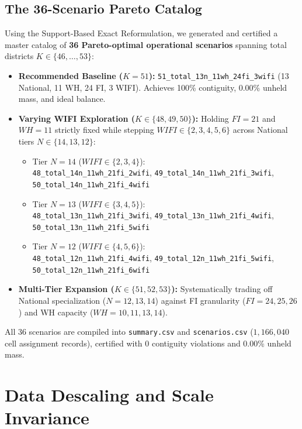 \documentclass[11pt,a4paper]{article}
\theoremstyle{plain}
\theoremstyle{definition}
\begin{document}
\subsection{The 36-Scenario Pareto Catalog}
Using the Support-Based Exact Reformulation, we generated and certified a master catalog of \textbf{36 Pareto-optimal operational scenarios} spanning total districts $K \in \{46, \dots, 53\}$:
\begin{itemize}[leftmargin=1.5em]
    \item \textbf{Recommended Baseline ($K=51$):} \texttt{51\_total\_13n\_11wh\_24fi\_3wifi} (13 National, 11 WH, 24 FI, 3 WIFI). Achieves 100\% contiguity, 0.00\% unheld mass, and ideal balance.
    \item \textbf{Varying WIFI Exploration ($K \in \{48, 49, 50\}$):} Holding $FI=21$ and $WH=11$ strictly fixed while stepping $WIFI \in \{2, 3, 4, 5, 6\}$ across National tiers $N \in \{14, 13, 12\}$:
    \begin{itemize}[leftmargin=1.2em]
        \item Tier $N=14$ ($WIFI \in \{2, 3, 4\}$): \\
        \texttt{48\_total\_14n\_11wh\_21fi\_2wifi}, \texttt{49\_total\_14n\_11wh\_21fi\_3wifi}, \\
        \texttt{50\_total\_14n\_11wh\_21fi\_4wifi}
        \item Tier $N=13$ ($WIFI \in \{3, 4, 5\}$): \\
        \texttt{48\_total\_13n\_11wh\_21fi\_3wifi}, \texttt{49\_total\_13n\_11wh\_21fi\_4wifi}, \\
        \texttt{50\_total\_13n\_11wh\_21fi\_5wifi}
        \item Tier $N=12$ ($WIFI \in \{4, 5, 6\}$): \\
        \texttt{48\_total\_12n\_11wh\_21fi\_4wifi}, \texttt{49\_total\_12n\_11wh\_21fi\_5wifi}, \\
        \texttt{50\_total\_12n\_11wh\_21fi\_6wifi}
    \end{itemize}
    \item \textbf{Multi-Tier Expansion ($K \in \{51, 52, 53\}$):} Systematically trading off National specialization ($N=12, 13, 14$) against FI granularity ($FI=24, 25, 26$) and WH capacity ($WH=10, 11, 13, 14$).
\end{itemize}
All 36 scenarios are compiled into \texttt{summary.csv} and \texttt{scenarios.csv} ($1,166,040$ cell assignment records), certified with 0 contiguity violations and 0.00\% unheld mass.

\section{Data Descaling and Scale Invariance}
\end{document}
